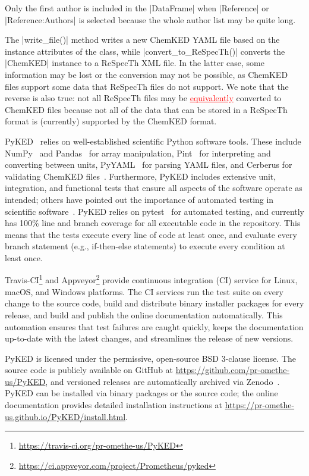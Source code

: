 \documentclass[12pt]{ijck}
\newcommand\ck{ChemKED}
\newcommand\pk{PyKED}
\newcommand{\addtwo}[1]{{\sloppy\textcolor{red}{\uline{#1}}}}  %
\begin{document}
Only the first author is included in the \pybox|DataFrame| when \pybox|Reference| or
\pybox|Reference:Authors| is selected because the whole author list may be
quite long.

The \pybox|write_file()| method writes a new \ck{} YAML file based on the instance attributes
of the class, while \pybox|convert_to_ReSpecTh()| converts the \pybox|ChemKED|
instance to a ReSpecTh XML file. In the latter case, some information may be lost or the conversion
may not be possible, as \ck{} files support some data that ReSpecTh files do not support. We note
that the reverse is also true: not all ReSpecTh files may be
\addtwo{equivalently} converted to \ck{} files because not
all of the data that can be stored in a ReSpecTh format is (currently) supported by the \ck{} format.

\pk{}~\autocite{PyKED} relies on well-established scientific Python software tools.
These include NumPy~\autocite{vanderWalt:2011np} and Pandas~\autocite{pandas,McKinney2010}
for array manipulation, Pint~\autocite{Grecco2016} for interpreting and converting
between units, PyYAML~\autocite{pyyaml} for parsing YAML
files, and Cerberus for validating \ck{} files~\autocite{cerberus}.
Furthermore, \pk{} includes extensive unit, integration, and functional tests
that ensure all aspects of the software operate as intended; others have pointed
out the importance of automated testing in scientific software~\autocite{Wilson:bestpractices}.
\pk{} relies on pytest~\autocite{pytest:3.0.1} for automated testing, and currently has
100\% line and branch coverage for all executable code in the repository. This
means that the tests execute every line of code at least once, and evaluate
every branch statement (e.g., if-then-else statements) to execute every condition
at least once.

Travis-CI\footnote{\url{https://travis-ci.org/pr-omethe-us/PyKED}} and
Appveyor\footnote{\url{https://ci.appveyor.com/project/Prometheus/pyked}} provide continuous
integration (CI) service for Linux, macOS, and Windows platforms. The CI services run the test suite
on every change to the source code, build and distribute binary installer packages for every
release, and build and publish the online documentation automatically. This automation ensures that
test failures are caught quickly, keeps the documentation up-to-date with the latest changes, and
streamlines the release of new versions.

\pk{} is licensed under the permissive, open-source BSD 3-clause license. The
source code is publicly available on GitHub at \url{https://github.com/pr-omethe-us/PyKED},
and versioned releases are automatically archived via Zenodo~\autocite{PyKED}.
\pk{} can be installed via binary packages or the source code; the online documentation
provides detailed installation instructions at
\url{https://pr-omethe-us.github.io/PyKED/install.html}.
\end{document}
